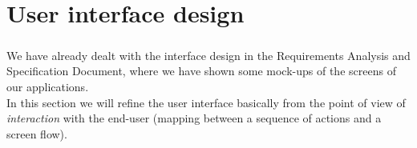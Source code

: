 \chapter{User interface design}\label{chapter:userInterfaceDesign}
\paragraph{}We have already dealt with the interface design in the Requirements Analysis and Specification Document, where we have shown some mock-ups of the screens of our applications.\\ In this section we will refine the user interface basically from the point of view of \textit{interaction} with the end-user (mapping between a sequence of actions and a screen flow).


